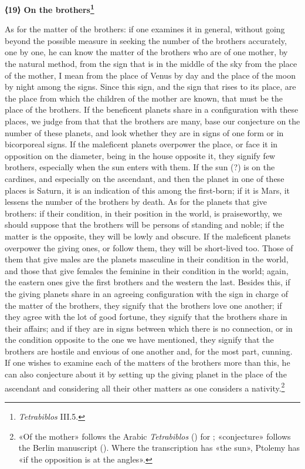 \documentclass[11pt]{article}
\newcommand{\Fol}[1]{\marginpar{\footnotesize\color{gray}f.\,#1}}
\newcommand{\ChapterHead}[4]{\par\needspace{8\baselineskip}\bigskip\pdfbookmark[1]{#1}{ch-#2}\hypertarget{EN-K#2}{}%
 {\large\bfseries\interlinepenalty=10000 #1#4{\normalfont\normalsize#3}\par}\nobreak\medskip}
\begin{document}
\ChapterHead{{\mdseries ⟨}19{\mdseries ⟩} On the brothers}{19}{}{\footnote{\emph{Tetrabiblos} III.5.}}
\par \Fol{40r}As for the matter of the brothers: if one examines it in general, without going beyond the possible measure in seeking the number of the brothers accurately, one by one, he can know the matter of the brothers who are of one mother, by the natural method, from the sign that is in the middle of the sky from the place of the mother, I mean from the place of Venus by day and the place of the moon by night among the signs. Since this sign, and the sign that rises to its place, are the place from which the children of the mother are known, that must be the place of the brothers. If the beneficent planets share in a configuration with these places, we judge from that that the brothers are many, base our conjecture on the number of these planets, and look whether they are in signs of one form or in bicorporeal signs. If the maleficent planets overpower the place, or face it in opposition on the diameter, being in the house opposite it, they signify few brothers, especially when the sun enters with them. If the sun (?) is on the cardines, and especially on the ascendant, and then the planet in one of these places is Saturn, it is an indication of this among the first-born; if it is Mars, it lessens the number of the brothers by death. As for the planets that give brothers: if their condition, in their position in the world, is praiseworthy, we should suppose that the brothers will be persons of standing and noble; if the matter is the opposite, they will be lowly and obscure. If the maleficent planets overpower the giving ones, or follow them, they will be short-lived too. Those of them that give males are the planets masculine in their condition in the world, and those that give females the feminine in their condition in the world; again, the eastern ones give the first brothers and the western the last. Besides this, if the giving planets share in an agreeing configuration with the sign in charge of the matter of the brothers, they signify that the brothers love one another; if they agree with the lot of good fortune, they signify that the brothers share in their affairs; and if they are in signs between which there is no connection, or in the condition opposite to the one we have mentioned, they signify that the brothers are hostile and envious of one another and, for the most part, cunning. If one wishes to examine each of the matters of the brothers more than this, he can also conjecture about it by setting up the giving planet in the place of the ascendant and considering all their other matters as one considers a nativity.\footnote{«Of the mother» follows the Arabic \emph{Tetrabiblos} () for ; «conjecture» follows the Berlin manuscript (). Where the transcription has «the sun», Ptolemy has «if the opposition is at the angles».}\par
\end{document}
